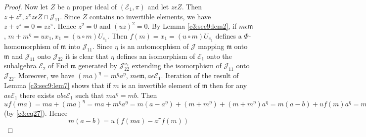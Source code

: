 \begin{proof}
Now let $Z$  be a proper ideal of $(\mathcal{E}_1,\pi)$ and
let $z\epsilon Z$. Then $z+z^{\pi},z^{\pi}z\epsilon
Z\cap \mathscr{J}_{11}$. Since $Z$ contains no
invertible elements, we have $z+z^{\pi}=0=z z^{\pi}$. Hence $z^{2}=0$
and $(uz)^{2}=0$. By Lemma \ref{c3:sec9:lem2}, if $m\epsilon\mathfrak{m}$,
$m+m^{\eta}=ux_1,x_1=(u\circ m)U_{e_1}$. Then $f(m)=x_1=(u\circ
m)U_{e_1}$ defines a $\Phi$-homomorphism of $\mathfrak{m}$ into
$\mathscr{J}_{11}$. Since $\eta$ is an automorphism of $\mathscr{J}$
mapping $\mathfrak{m}$ onto $\mathfrak{m}$ and $\mathscr{J}_{11}$
onto $\mathscr{J}_{22}$ it is clear that $\eta$ defines\pageoriginale
an isomorphism of $\mathcal{E}_1$ onto the subalgebra $\mathcal{E}_2$
of End $\mathfrak{m}$ generated by $\mathscr{J}_{22}^{\nu_2}$
extending the isomorphism of $\mathscr{J}_{11}$ onto
$\mathscr{J}_{22}$. Moreover, we have $(ma)^{\eta}=m^{\eta}a^{\eta}$,
$m\epsilon \mathfrak{m}, a\epsilon \mathcal{E}_1$. Iteration of the
result of Lemma \ref{c3:sec9:lem7} shows that if $m$ is an invertible element of
$\mathfrak{m}$ then for any $a\epsilon \mathcal{E}_1$ there exists
$ab\epsilon \mathcal{E}_1$ such that $ma^{\eta}=mb$. Then
$uf(ma)=ma+(ma)^{\eta}=ma+m^{\eta}a^{\eta}=m(a-a^{\eta})+(m+m^{\eta})+(m+m^{\eta})a^{\eta}=m(a-b)+uf(m)a^{\eta}=m(a-b)+ua^{\eta}f(m)=m(a-b)+ua^{\pi}f(m)$ 
(by \eqref{c3:eq27}). Hence
\begin{equation*}
  m(a-b)=u(f(ma)-a^{\pi}f(m))\tag{32}\label{c3:eq32}
\end{equation*}


\end{proof}
